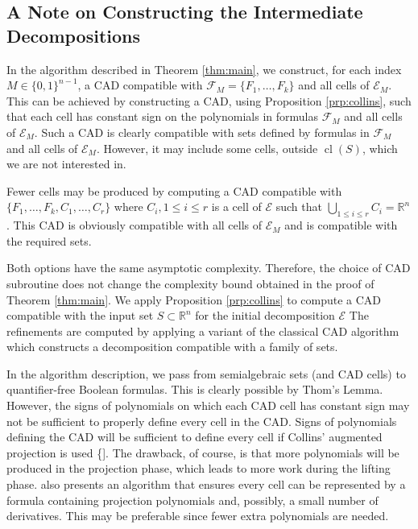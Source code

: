 \documentclass[
]{book}
\theoremstyle{definition}
\theoremstyle{definition}
\theoremstyle{definition}
\theoremstyle{definition}
\theoremstyle{remark}
\begin{document}
\hypertarget{a-note-on-constructing-the-intermediate-decompositions}{%
\subsection{A Note on Constructing the Intermediate Decompositions}\label{a-note-on-constructing-the-intermediate-decompositions}}

In the algorithm described in Theorem \ref{thm:main}, we construct, for each index \(M \in \{0,1\}^{n-1}\), a CAD compatible with \(\mathcal{F}_M = \{F_1,\ldots,F_k\}\) and all cells of \(\mathcal{E}_M\).
This can be achieved by constructing a CAD, using Proposition \ref{prp:collins}, such that each cell has constant sign on the polynomials in formulas \(\mathcal{F}_M\) and all cells of \(\mathcal{E}_M\). Such a CAD is clearly compatible with sets defined by formulas in \(\mathcal{F}_M\) and all cells of \(\mathcal{E}_M\). However, it may include some cells, outside \({\operatorname{cl} \left( S \right)}\), which we are not interested in.

Fewer cells may be produced by computing a CAD compatible with \(\{F_1,\ldots,F_k, C_1,\ldots,C_r\}\) where \(C_i,1\le i \le r\) is a cell of \(\mathcal{E}\) such that \(\bigcup_{1\le i \le r} C_i = \mathbb{R}^n\). This CAD is obviously compatible with all cells of \(\mathcal{E}_M\) and is compatible with the required sets.

Both options have the same asymptotic complexity. Therefore, the choice of CAD subroutine does not change the complexity bound obtained in the proof of Theorem \ref{thm:main}. We apply Proposition \ref{prp:collins} to compute a CAD compatible with the input set \(S\subset \mathbb{R}^n\) for the initial decomposition \(\mathcal{E}\)
The refinements are computed by applying a variant of the classical CAD algorithm which constructs a decomposition compatible with a family of sets.

In the algorithm description, we pass from semialgebraic sets (and CAD cells) to quantifier-free Boolean formulas.
This is clearly possible by Thom's Lemma. However, the signs of polynomials on which each CAD cell has constant sign may not be sufficient to properly define every cell in the CAD. Signs of polynomials defining the CAD will be sufficient to define every cell if Collins' augmented projection is used \{\citet{collins1975}{]}. The drawback, of course, is that more polynomials will be produced in the projection phase, which leads to more work during the lifting phase.
\citet{brown99} also presents an algorithm that ensures every cell can be represented by a formula containing projection polynomials and, possibly, a small number of derivatives. This may be preferable since fewer extra polynomials are needed.
\end{document}

